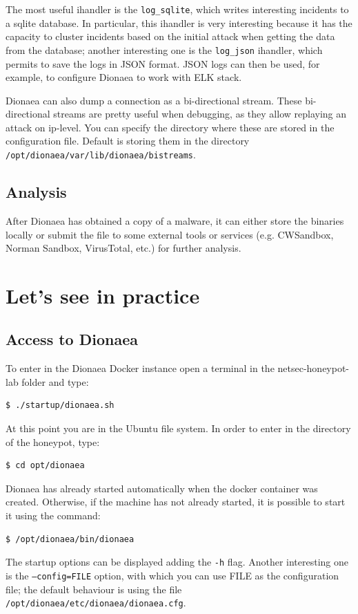 \documentclass[epsfig,a4paper,11pt,titlepage,oneside,openany]{book}
\begin{document}
\begin{itemize}
The most useful ihandler is the \texttt{log\_sqlite}, which writes interesting incidents to a sqlite database. In particular, this ihandler is very interesting because it has the capacity to cluster incidents based on the initial attack when getting the data from the database; another interesting one is the \texttt{log\_json} ihandler, which permits to save the logs in JSON format. JSON logs can then be used, for example, to configure Dionaea to work with ELK stack.

Dionaea can also dump a connection as a bi-directional stream. These bi-directional streams are pretty useful when debugging, as they allow replaying an attack on ip-level. You can specify the directory where these are stored in the configuration file. Default is storing them in the directory \texttt{/opt/dionaea/var/lib/dionaea/bistreams}.

\subsection{Analysis}

After Dionaea has obtained a copy of a malware, it can either store the binaries locally or submit the file to some external tools or services (e.g. CWSandbox, Norman Sandbox, VirusTotal, etc.) for further analysis.

\section{Let's see in practice}

\subsection{Access to Dionaea}


To enter in the Dionaea Docker instance open a terminal in the netsec-honeypot-lab folder and type:

\begin{lstlisting}[language=bash]
$ ./startup/dionaea.sh
\end{lstlisting}

\noindent At this point you are in the Ubuntu file system. In order to enter in the directory of the honeypot, type:
\begin{lstlisting}[language=bash]
$ cd opt/dionaea
\end{lstlisting}

\noindent Dionaea has already started automatically when the docker container was created. Otherwise, if the machine has not already started, it is possible to start it using the command:
\begin{lstlisting}[language=bash]
$ /opt/dionaea/bin/dionaea
\end{lstlisting}
The startup options can be displayed adding the \texttt{-h} flag. Another interesting one is the \texttt{--config=FILE} option, with which you can use FILE as the configuration file; the default behaviour is using the file \texttt{/opt/dionaea/etc/dionaea/dionaea.cfg}.


\end{itemize}
\end{document}
